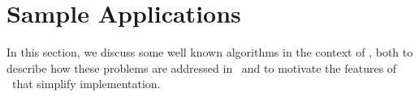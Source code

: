 \section{Sample Applications}
\label{sample_apps}

In this section, we discuss some well known algorithms in the context of \Q, both
to describe how these problems are addressed in \Q\ and to motivate the features
of \Q\ that simplify implementation.





